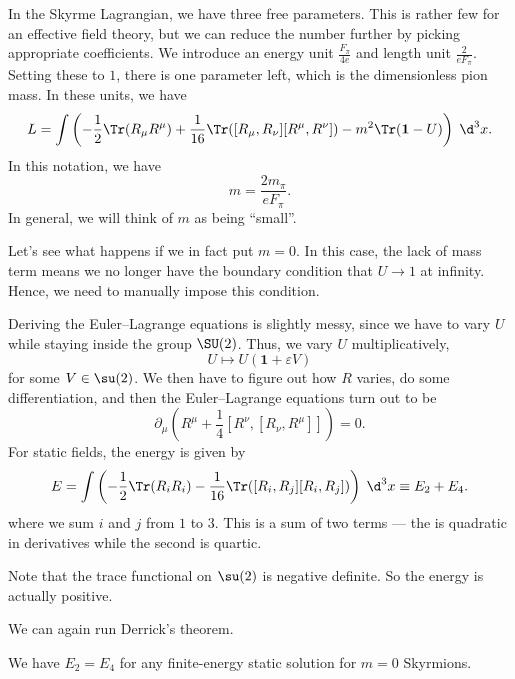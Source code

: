 \documentclass[a4paper]{article}
\begin{document}
In the Skyrme Lagrangian, we have three free parameters. This is rather few for an effective field theory, but we can reduce the number further by picking appropriate coefficients. We introduce an energy unit $\frac{F_\pi}{4e}$ and length unit $\frac{2}{eF_\pi}$. Setting these to $1$, there is one parameter left, which is the dimensionless pion mass. In these units, we have
\[
  L = \int \left(-\frac{1}{2}\Tr(R_\mu R^\mu) + \frac{1}{16} \Tr([R_\mu, R_\nu][R^\mu, R^\nu]) - m^2 \Tr(\mathbf{1} - U)\right)\;\d^3 x.
\]
In this notation, we have
\[
  m = \frac{2m_\pi}{e F_\pi}.
\]
In general, we will think of $m$ as being ``small''.

Let's see what happens if we in fact put $m = 0$. In this case, the lack of mass term means we no longer have the boundary condition that $U \to 1$ at infinity. Hence, we need to manually impose this condition.

Deriving the Euler--Lagrange equations is slightly messy, since we have to vary $U$ while staying inside the group $\SU(2)$. Thus, we vary $U$ multiplicatively,
\[
  U \mapsto U (\mathbf{1} + \varepsilon V)
\]
for some $V \in \su(2)$. We then have to figure out how $R$ varies, do some differentiation, and then the Euler--Lagrange equations turn out to be
\[
  \partial_\mu \left(R^\mu + \frac{1}{4} [R^\nu, [R_\nu, R^\mu]]\right) = 0.
\]
For static fields, the energy is given by
\[
  E = \int \left(-\frac{1}{2} \Tr(R_i R_i) - \frac{1}{16} \Tr([R_i, R_j] [R_i, R_j])\right)\;\d^3 x \equiv E_2 + E_4.
\]
where we sum $i$ and $j$ from $1$ to $3$. This is a sum of two terms --- the is quadratic in derivatives while the second is quartic.

Note that the trace functional on $\su(2)$ is negative definite. So the energy is actually positive.

We can again run Derrick's theorem.
\begin{thm}
  We have $E_2 = E_4$ for any finite-energy static solution for $m = 0$ Skyrmions.
\end{thm}
\end{document}

